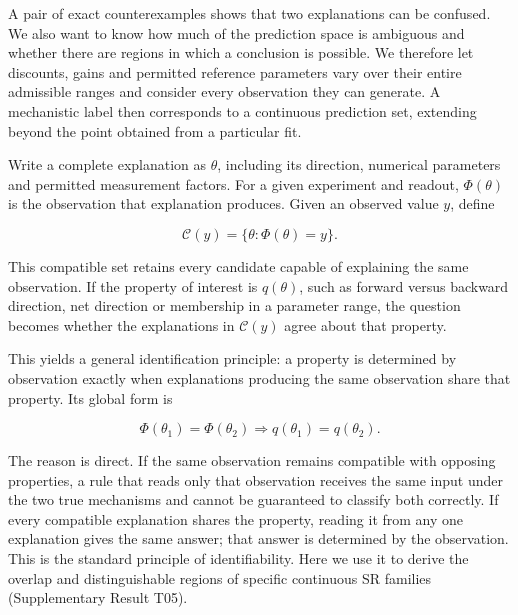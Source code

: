 \documentclass[11pt,a4paper]{article}
\begin{document}
A pair of exact counterexamples shows that two explanations can be
confused. We also want to know how much of the prediction space is
ambiguous and whether there are regions in which a conclusion is
possible. We therefore let discounts, gains and permitted reference
parameters vary over their entire admissible ranges and consider every
observation they can generate. A mechanistic label then corresponds to a
continuous prediction set, extending beyond the point obtained from a
particular fit.

\par
\noindent\begin{minipage}{\linewidth}

Write a complete explanation as \(\theta\), including its direction,
numerical parameters and permitted measurement factors. For a given
experiment and readout, \(\Phi(\theta)\) is the observation that
explanation produces. Given an observed value \(y\), define

\[
\mathcal C(y)=\{\theta:\Phi(\theta)=y\}.
\]

\end{minipage}\par

This compatible set retains every candidate capable of explaining the
same observation. If the property of interest is \(q(\theta)\), such as
forward versus backward direction, net direction or membership in a
parameter range, the question becomes whether the explanations in
\(\mathcal C(y)\) agree about that property.

\par
\noindent\begin{minipage}{\linewidth}

This yields a general identification principle: a property is determined
by observation exactly when explanations producing the same observation
share that property. Its global form is

\[
\Phi(\theta_1)=\Phi(\theta_2)
\Longrightarrow
q(\theta_1)=q(\theta_2).
\]

\end{minipage}\par

The reason is direct. If the same observation remains compatible with
opposing properties, a rule that reads only that observation receives
the same input under the two true mechanisms and cannot be guaranteed to
classify both correctly. If every compatible explanation shares the
property, reading it from any one explanation gives the same answer;
that answer is determined by the observation. This is the standard
principle of identifiability. Here we use it to derive the overlap and
distinguishable regions of specific continuous SR families
(Supplementary Result T05).
\end{document}
